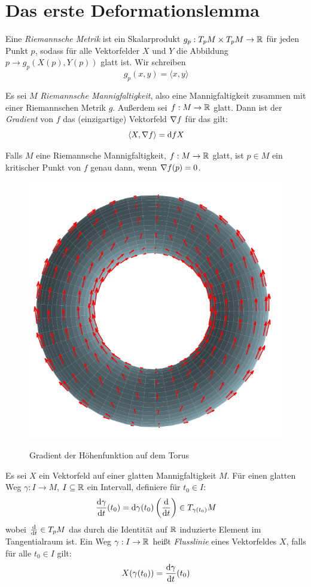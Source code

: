 \section{Das erste Deformationslemma}

\begin{definition}
    Eine \textit{Riemannsche Metrik} ist ein Skalarprodukt 
    $g_p:T_pM \times T_pM \to \R$ für jeden Punkt $p$, sodass für alle 
    Vektorfelder $X$ und $Y$ die Abbildung $p \to g_p(X(p), Y(p))$ glatt ist.
    Wir schreiben 
    \[ g_p(x, y) = \langle x, y \rangle \]
\end{definition}

\begin{definition}[Gradient]
    Es sei $M$ \textit{Riemannsche Mannigfaltigkeit}, also eine Mannigfaltigkeit
    zusammen mit einer Riemannschen Metrik $g$. Außerdem sei $f: M \to \R$ glatt.
    Dann ist der \textit{Gradient} von $f$ das (einzigartige) 
    Vektorfeld $\grad f$ für das gilt:
    \[ \langle X, \grad f \rangle = \opd fX \]
\end{definition}

Falls $M$ eine Riemannsche Mannigfaltigkeit, $f: M \to \R$ glatt, ist $p \in M$ 
ein kritischer Punkt von $f$ genau dann, wenn $\grad f (p) = 0$.

\begin{figure}[H]
    \centering
    \includegraphics[width=0.7\linewidth]{resources/Me-Diagram4-gradient-of-hightmapping.png}
    \label{fig:me-diagram4}
    \caption{Gradient der Höhenfunktion auf dem Torus}
\end{figure}

\begin{definition}
    Es sei $X$ ein Vektorfeld auf einer glatten Mannigfaltigkeit $M$. Für einen
    glatten Weg $\gamma: I \to M$, $I \subseteq \R$ ein Intervall, 
    definiere für $t_0 \in I$:
    \[ \derive[\gamma]{t}(t_0) = \opd \gamma (t_0) \left(\derive{t}\right) \in T_{\gamma(t_0)}M \]
    wobei $\derive{t} \in T_pM$ das durch die Identität auf $\R$
    induzierte Element im Tangentialraum ist.
    Ein Weg $\gamma: I \to \R$ heißt \textit{Flusslinie} eines Vektorfeldes $X$,
    falls für alle $t_0 \in I$ gilt:
    \[ X(\gamma(t_0)) = \derive[\gamma]{t}(t_0) \]
\end{definition}

